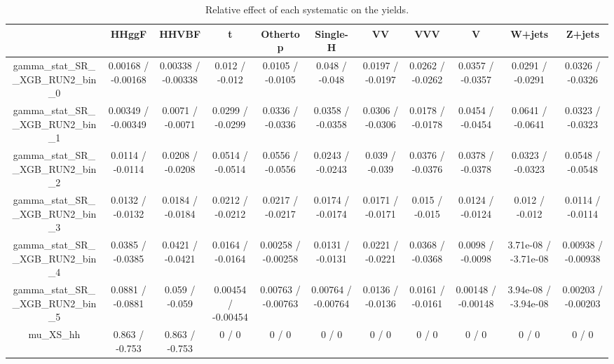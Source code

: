 \documentclass[10pt]{article}
\begin{document}
\begin{table}[htbp]
\begin{center}
\begin{tabular}{|c|c|c|c|c|c|c|c|c|c|c|}
\hline 
      & HHggF      & HHVBF      & t      & Othertop      & Single-H      & VV      & VVV      & V      & W+jets      & Z+jets \\ 
\hline 
  gamma_stat_SR__XGB_RUN2_bin_0 & 0.00168 / -0.00168 & 0.00338 / -0.00338 & 0.012 / -0.012 & 0.0105 / -0.0105 & 0.048 / -0.048 & 0.0197 / -0.0197 & 0.0262 / -0.0262 & 0.0357 / -0.0357 & 0.0291 / -0.0291 & 0.0326 / -0.0326 \\ 
  gamma_stat_SR__XGB_RUN2_bin_1 & 0.00349 / -0.00349 & 0.0071 / -0.0071 & 0.0299 / -0.0299 & 0.0336 / -0.0336 & 0.0358 / -0.0358 & 0.0306 / -0.0306 & 0.0178 / -0.0178 & 0.0454 / -0.0454 & 0.0641 / -0.0641 & 0.0323 / -0.0323 \\ 
  gamma_stat_SR__XGB_RUN2_bin_2 & 0.0114 / -0.0114 & 0.0208 / -0.0208 & 0.0514 / -0.0514 & 0.0556 / -0.0556 & 0.0243 / -0.0243 & 0.039 / -0.039 & 0.0376 / -0.0376 & 0.0378 / -0.0378 & 0.0323 / -0.0323 & 0.0548 / -0.0548 \\ 
  gamma_stat_SR__XGB_RUN2_bin_3 & 0.0132 / -0.0132 & 0.0184 / -0.0184 & 0.0212 / -0.0212 & 0.0217 / -0.0217 & 0.0174 / -0.0174 & 0.0171 / -0.0171 & 0.015 / -0.015 & 0.0124 / -0.0124 & 0.012 / -0.012 & 0.0114 / -0.0114 \\ 
  gamma_stat_SR__XGB_RUN2_bin_4 & 0.0385 / -0.0385 & 0.0421 / -0.0421 & 0.0164 / -0.0164 & 0.00258 / -0.00258 & 0.0131 / -0.0131 & 0.0221 / -0.0221 & 0.0368 / -0.0368 & 0.0098 / -0.0098 & 3.71e-08 / -3.71e-08 & 0.00938 / -0.00938 \\ 
  gamma_stat_SR__XGB_RUN2_bin_5 & 0.0881 / -0.0881 & 0.059 / -0.059 & 0.00454 / -0.00454 & 0.00763 / -0.00763 & 0.00764 / -0.00764 & 0.0136 / -0.0136 & 0.0161 / -0.0161 & 0.00148 / -0.00148 & 3.94e-08 / -3.94e-08 & 0.00203 / -0.00203 \\ 
  mu_XS_hh & 0.863 / -0.753 & 0.863 / -0.753 & 0 / 0 & 0 / 0 & 0 / 0 & 0 / 0 & 0 / 0 & 0 / 0 & 0 / 0 & 0 / 0 \\ 
\hline 
\end{tabular} 
\caption{Relative effect of each systematic on the yields.} 
\end{center} 
\end{table} 
\end{document}

